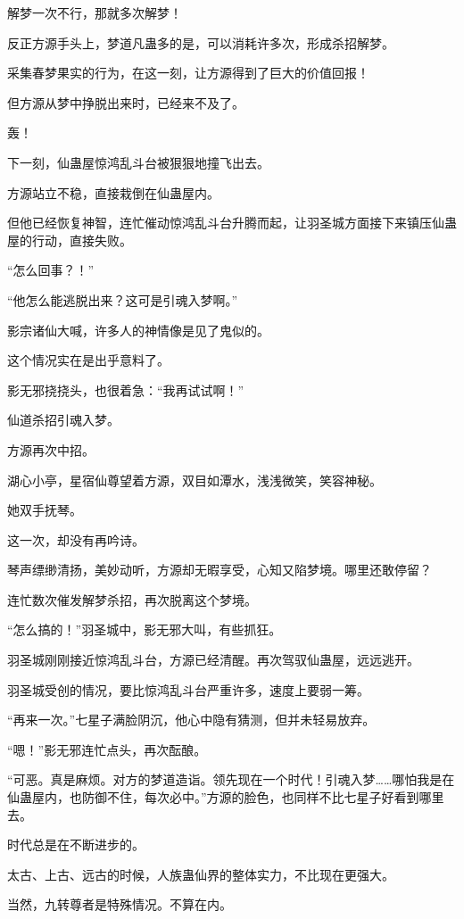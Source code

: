 \begin{this_body}
解梦一次不行，那就多次解梦！

反正方源手头上，梦道凡蛊多的是，可以消耗许多次，形成杀招解梦。

采集春梦果实的行为，在这一刻，让方源得到了巨大的价值回报！

但方源从梦中挣脱出来时，已经来不及了。

轰！

下一刻，仙蛊屋惊鸿乱斗台被狠狠地撞飞出去。

方源站立不稳，直接栽倒在仙蛊屋内。

但他已经恢复神智，连忙催动惊鸿乱斗台升腾而起，让羽圣城方面接下来镇压仙蛊屋的行动，直接失败。

“怎么回事？！”

“他怎么能逃脱出来？这可是引魂入梦啊。”

影宗诸仙大喊，许多人的神情像是见了鬼似的。

这个情况实在是出乎意料了。

影无邪挠挠头，也很着急：“我再试试啊！”

仙道杀招引魂入梦。

方源再次中招。

湖心小亭，星宿仙尊望着方源，双目如潭水，浅浅微笑，笑容神秘。

她双手抚琴。

这一次，却没有再吟诗。

琴声缥缈清扬，美妙动听，方源却无暇享受，心知又陷梦境。哪里还敢停留？

连忙数次催发解梦杀招，再次脱离这个梦境。

“怎么搞的！”羽圣城中，影无邪大叫，有些抓狂。

羽圣城刚刚接近惊鸿乱斗台，方源已经清醒。再次驾驭仙蛊屋，远远逃开。

羽圣城受创的情况，要比惊鸿乱斗台严重许多，速度上要弱一筹。

“再来一次。”七星子满脸阴沉，他心中隐有猜测，但并未轻易放弃。

“嗯！”影无邪连忙点头，再次酝酿。

“可恶。真是麻烦。对方的梦道造诣。领先现在一个时代！引魂入梦……哪怕我是在仙蛊屋内，也防御不住，每次必中。”方源的脸色，也同样不比七星子好看到哪里去。

时代总是在不断进步的。

太古、上古、远古的时候，人族蛊仙界的整体实力，不比现在更强大。

当然，九转尊者是特殊情况。不算在内。


\end{this_body}
